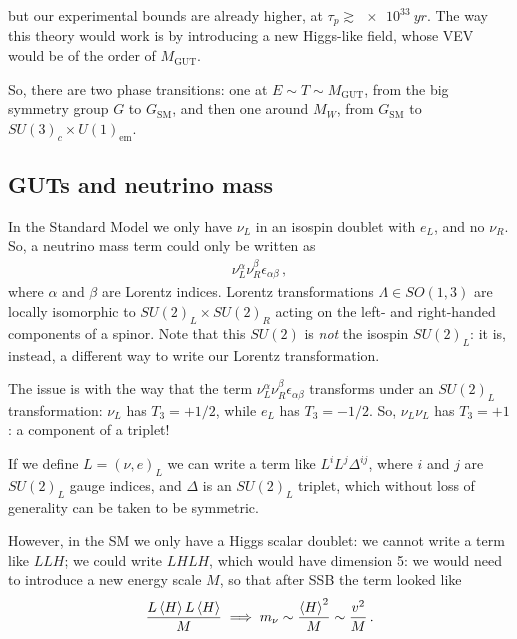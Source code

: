 \documentclass[main.tex]{subfiles}
\begin{document}
but our experimental bounds are already higher, at \(\tau_{p} \gtrsim \SI{e33}{yr}\). 
The way this theory would work is by introducing a new Higgs-like field, whose VEV would be of the order of \(M _{\text{GUT}}\). 

So, there are two phase transitions: one at \(E \sim T \sim M _{\text{GUT}}\), from the big symmetry group \(G\) to \(G _{\text{SM}}\), and then one around \(M_W\), from \(G _{\text{SM}}\) to \(SU(3)_c \times U(1) _{\text{em}}\).

\subsection{GUTs and neutrino mass}

In the Standard Model we only have \(\nu_{L}\) in an isospin doublet with \(e_L\), and no \(\nu_{R}\). 
So, a neutrino mass term could only be written as 
%
\begin{align}
\nu_{L}^{\alpha } \nu_{R}^{\beta } \epsilon_{\alpha \beta }
\,,
\end{align}
%
where \(\alpha \) and \(\beta \) are Lorentz indices. 
Lorentz transformations \(\Lambda \in SO(1, 3)\) are locally isomorphic to \(SU(2)_L \times SU(2)_R\) acting on the left- and right-handed components of a spinor. Note that this \(SU(2)\) is \emph{not} the isospin \(SU(2)_L\): it is, instead, a different way to write our Lorentz transformation. 

The issue is with the way that the term \(\nu_{L}^{\alpha } \nu_{R}^{\beta } \epsilon_{\alpha \beta } \) transforms under an \(SU(2)_L\) transformation: \(\nu_L \) has \(T_3 = + 1/2\), while \(e_L\) has \(T_3 = - 1/2\). So, \(\nu_{L } \nu_{L}\) has \(T_3 = +1\): a component of a  triplet! 

If we define \(L = (\nu , e)_L\) we can write a term like \(L^{i} L^{j} \Delta^{ij}\), where \(i\) and \(j\) are \(SU(2)_L\) gauge indices, and \(\Delta \) is an \(SU(2)_L\) triplet, which without loss of generality can be taken to be symmetric. 

However, in the SM we only have a Higgs scalar doublet: we cannot write a term like \(LLH\); we could write \(LHLH\), which would have dimension 5: we would need to introduce a new energy scale \(M\), so that after SSB the term looked like 
%
\begin{align}
\frac{L \expval{H} L \expval{H}}{M} \implies m_\nu \sim \frac{\expval{H}^2}{M} \sim \frac{v^2}{M}
\,.
\end{align}
\end{document}

